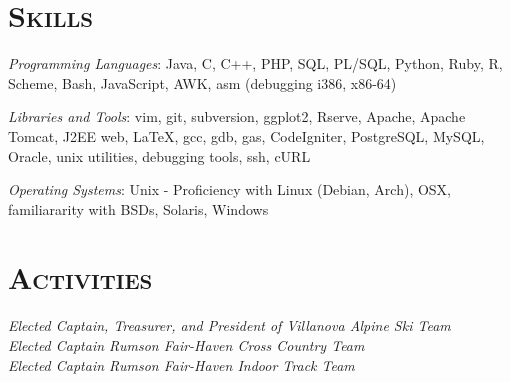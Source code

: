 \documentclass[line,margin]{resume}
\begin{document}
\begin{resume}

\section{\textsc{Skills}}

\emph{Programming Languages}: Java, C, C++, PHP, SQL, PL/SQL, Python, Ruby, R,
Scheme, Bash, JavaScript, AWK, asm (debugging i386, x86-64)

\emph{Libraries and Tools}: vim, git, subversion, ggplot2, Rserve, Apache,
Apache Tomcat, J2EE web, LaTeX, gcc, gdb, gas, CodeIgniter, PostgreSQL,
MySQL, Oracle, unix utilities, debugging tools, ssh, cURL

\emph{Operating Systems}: Unix - Proficiency with Linux (Debian, Arch), OSX,
familiararity with BSDs, Solaris, Windows


\section{\textsc{Activities}}

\emph{Elected Captain, Treasurer, and President of Villanova Alpine Ski Team} \\
\emph{Elected Captain Rumson Fair-Haven Cross Country Team} \\
\emph{Elected Captain Rumson Fair-Haven Indoor Track Team} \\
\newpage

\end{resume}
\end{document}
